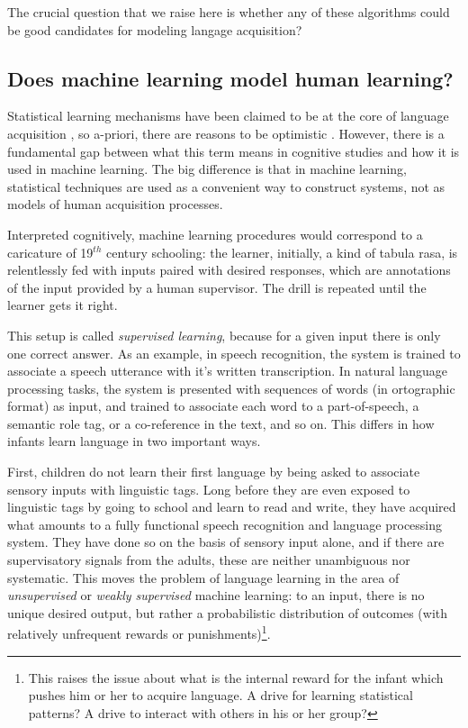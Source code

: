 \documentclass[jou,apacite]{apa6}
\begin{document}
The crucial question that we raise here is whether any of these algorithms could be good candidates for modeling langage acquisition? 

\subsection{Does machine learning model human learning?}

Statistical learning mechanisms have been claimed to be at the core of language acquisition \cite{saffran_2003}, so a-priori, there are reasons to be optimistic \cite{meltzoff_2009}. However, there is a fundamental gap between what this term means in cognitive studies and how it is used in machine learning. The big difference is that in machine learning, statistical techniques are used as a convenient way to construct systems, not as models of human acquisition processes. 

Interpreted cognitively, machine learning procedures would correspond to a caricature of 19$^{th}$ century schooling: the learner, initially, a kind of tabula rasa, is relentlessly fed with inputs paired with desired responses, which are annotations of the input provided by a human supervisor. The drill is repeated until the learner gets it right. %

This setup is called \textit{supervised learning}, because for a given input there is only one correct answer. %
As an example, in speech recognition, the system is  trained to associate a speech utterance with it's written transcription.  In natural language processing tasks, the system is presented with sequences of words (in ortographic format) as input, and trained to associate each word to a part-of-speech, a semantic role tag, or a co-reference in the text, and so on. %
This differs in how infants learn language in two important ways. 

First, children do not learn their first language by being asked to associate sensory inputs with linguistic tags. Long before they are even exposed to linguistic tags by going to school and learn to read and write, they have acquired what amounts to a fully functional speech recognition and language processing system. They have done so on the basis of sensory input alone, and if there are supervisatory signals from the adults, these are neither unambiguous nor systematic. This moves the problem of language learning in the area of \textit{unsupervised} or \textit{weakly supervised} machine learning: to an input, there is no unique desired output, but rather a probabilistic distribution of outcomes (with relatively unfrequent rewards or punishments)\footnote{This raises the issue about what is the internal reward for the infant which pushes him or her to acquire language. A drive for learning statistical patterns? A drive to interact with others in his or her group?}. 
 
\end{document}

